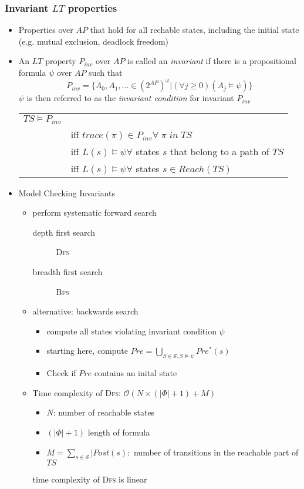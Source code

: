 \documentclass[a4paper, 10pt]{article}
\begin{document}
\subsubsection*{Invariant $LT$ properties}
\begin{itemize}
    \item Properties over $AP$ that hold for all rechable states, including the initial state (e.g. mutual exclusion, deadlock freedom)
    \item
    \begin{shaded}
        An $LT$ property $P_{inv}$ over $AP$ is called an \emph{invariant} if there is a propositional formula $\psi$ over $AP$ such that
        \[ P_{inv} = \{ A_0,A_1,\dots\in (2^{AP})^\omega | (\forall j\geq0)(A_j\models\psi) \} \]
        $\psi$ is then referred to as the \emph{invariant condition} for invariant $P_{inv}$
    \end{shaded}
    \begin{tabular}[t]{ll}
    $TS\models P_{inv}$ & \\
    & iff $trace(\pi)\in P_{inv}\forall \; \pi \; in \; TS$ \\
    & iff $L(s)\models\psi\forall$ states $s$ that belong to a path of $TS$ \\
    & iff $L(s)\models\psi\forall$ states $s\in Reach(TS)$
    \end{tabular}
    \item Model Checking Invariants
    \begin{itemize}
        \item perform systematic forward search
        \begin{description}
            \item[depth first search] \textsc{Dfs}
            \item[breadth first search] \textsc{Bfs}
        \end{description}
        \item alternative: backwards search
        \begin{itemize}
            \item compute all states violating invariant condition $\psi$
            \item starting here, compute $Pre=\bigcup_{S\in\mathcal{S},S\not\models\psi}Pre^*(s)$
            \item Check if $Pre$ contains an inital state
        \end{itemize}
        \item Time complexity of \textsc{Dfs}: $\mathcal{O}(N\times(|\Phi|+1)+M)$
        \begin{itemize}
            \item $N$: number of reachable states
            \item $(|\Phi|+1)$ length of formula
            \item $M=\sum_{s\in\mathcal{S}}|Post(s):$ number of transitions in the reachable part of $TS$
        \end{itemize}
        \follows time complexity of \textsc{Dfs} is linear
    \end{itemize}
\end{itemize}
\end{document}
